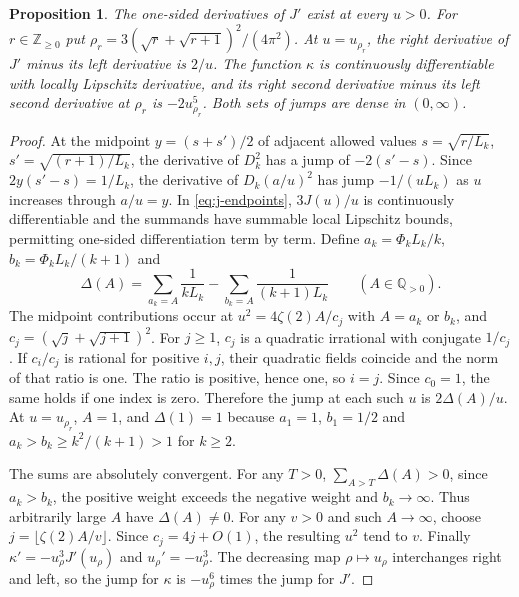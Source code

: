 \documentclass[11pt]{amsart}
\newtheorem{proposition}[theorem]{Proposition}
\theoremstyle{remark}
\newcommand{\Z}{\mathbb Z}
\begin{document}
\begin{proposition}\label{prop:kappa-corners}
The one-sided derivatives of \(J'\) exist at every \(u>0\).
For \(r\in\Z_{\ge0}\) put
\(\rho_r=3(\sqrt r+\sqrt{r+1})^2/(4\pi^2)\).
At \(u=u_{\rho_r}\), the right derivative of \(J'\) minus its left
derivative is \(2/u\). The function \(\kappa\) is continuously
differentiable with locally Lipschitz derivative, and its right
second derivative minus its left second derivative at \(\rho_r\)
is \(-2u_{\rho_r}^{5}\). Both sets of jumps are dense in \((0,\infty)\).
\end{proposition}
\begin{proof}
At the midpoint \(y=(s+s')/2\) of adjacent allowed values
\(s=\sqrt{r/L_k}\), \(s'=\sqrt{(r+1)/L_k}\), the derivative of \(D_k^2\)
has a jump of \(-2(s'-s)\). Since \(2y(s'-s)=1/L_k\),
the derivative of \(D_k(a/u)^2\) has jump \(-1/(uL_k)\) as \(u\)
increases through \(a/u=y\).
In \eqref{eq:j-endpoints}, \(3J(u)/u\) is continuously differentiable
and the summands have summable local Lipschitz bounds, permitting
one-sided differentiation term by term. Define
\(a_k=\Phi_kL_k/k\), \(b_k=\Phi_kL_k/(k+1)\) and
\[
 \Delta(A)=\sum_{a_k=A}\frac{1}{kL_k}
      -\sum_{b_k=A}\frac{1}{(k+1)L_k}\qquad(A\in\mathbb Q_{>0}).
\]
The midpoint contributions occur at \(u^2=4\zeta(2)A/c_j\) with
\(A=a_k\) or \(b_k\), and \(c_j=(\sqrt j+\sqrt{j+1})^2\).
For \(j\ge1\), \(c_j\) is a quadratic irrational with conjugate \(1/c_j\).
If \(c_i/c_j\) is rational for positive \(i,j\), their quadratic fields
coincide and the norm of that ratio is one. The ratio is positive,
hence one, so \(i=j\). Since \(c_0=1\), the same holds if one index is zero.
Therefore the jump at each such \(u\) is \(2\Delta(A)/u\).
At \(u=u_{\rho_r}\), \(A=1\), and \(\Delta(1)=1\) because
\(a_1=1\), \(b_1=1/2\) and \(a_k>b_k\ge k^2/(k+1)>1\) for \(k\ge2\).

The sums are absolutely convergent. For any \(T>0\),
\(\sum_{A>T}\Delta(A)>0\), since \(a_k>b_k\), the positive weight
exceeds the negative weight and \(b_k\to\infty\).
Thus arbitrarily large \(A\) have \(\Delta(A)\ne0\).
For any \(v>0\) and such \(A\to\infty\), choose
\(j=\lfloor\zeta(2)A/v\rfloor\). Since \(c_j=4j+O(1)\), the resulting
\(u^2\) tend to \(v\). Finally \(\kappa'=-u_\rho^3J'(u_\rho)\) and
\(u_\rho'=-u_\rho^3\). The decreasing map \(\rho\mapsto u_\rho\)
interchanges right and left, so the jump for \(\kappa\) is
\(-u_\rho^6\) times the jump for \(J'\).
\end{proof}
\end{document}
